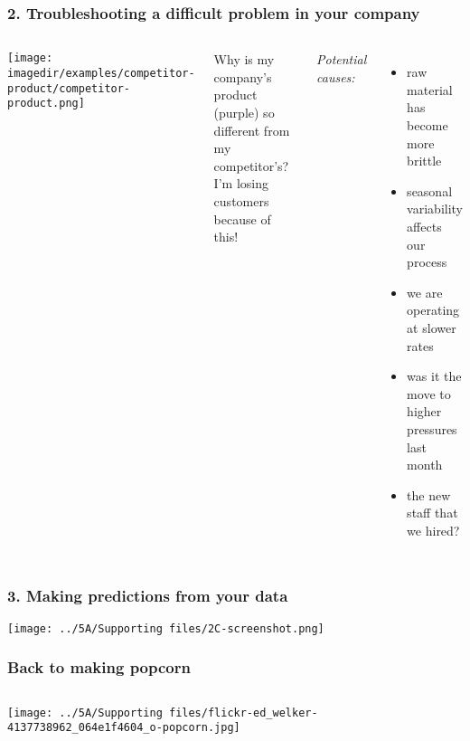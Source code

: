 \begin{frame}\frametitle{2. Troubleshooting a difficult problem in your company}
	\begin{columns}[T]
			\texttt{[image: \\imagedir/examples/competitor-product/competitor-product.png]}
			
			
			Why is {\color{purple} my company's product (purple)} so different from my {\color{red} competitor's}? \\
			I'm losing customers because of this!
			
			\vspace{0.5cm}
			{\color{blue}\emph{Potential causes:}}
			\begin{itemize}
				\item	raw material has become more brittle
				\item	seasonal variability affects our process
				\item	we are operating at slower rates
				\item	was it the move to higher pressures last month
				\item	the new staff that we hired?
			\end{itemize}
			
	\end{columns}
\end{frame}

\begin{frame}\frametitle{3. Making predictions from your data}
	\texttt{[image: ../5A/Supporting files/2C-screenshot.png]}
\end{frame}

\begin{frame}\frametitle{Back to making popcorn}
	\begin{columns}[T]
			\texttt{[image: ../5A/Supporting files/flickr-ed\_welker-4137738962\_064e1f4604\_o-popcorn.jpg]}

			
			\vspace{5cm}
	\end{columns}
	
\end{frame}

